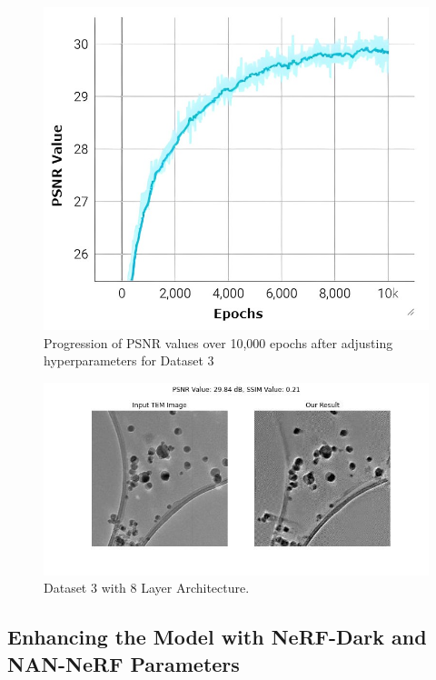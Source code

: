 \begin{figure}[H]
    \centering
    \includegraphics[width=.7\textwidth]{img/Final 10K PSNR graph.jpg}
    \caption{Progression of PSNR values over 10,000 epochs after adjusting hyperparameters for Dataset 3}\label{fig:Dataset 3 0 to 10000 epochs PSNR values(Final)}
\end{figure}

\begin{figure}[H]
    \centering
    \includegraphics[width=.9\textwidth]{img/Dataset_3_with_8_Layer.jpg}
    \caption{Dataset 3 with  8 Layer Architecture.}\label{fig:Dataset_3_with_8_layer.jpg}
\end{figure}




\subsection{Enhancing the Model with NeRF-Dark and NAN-NeRF Parameters}

